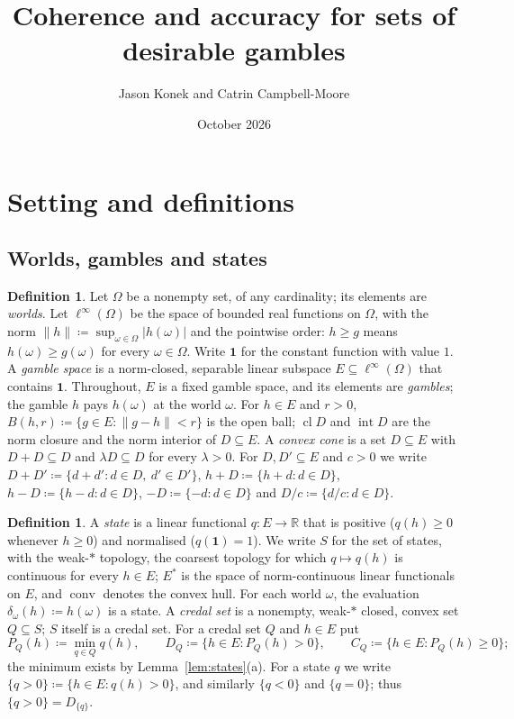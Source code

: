 \documentclass[11pt]{article}
\title{Coherence and accuracy for sets of desirable gambles}
\author{Jason Konek and Catrin Campbell-Moore}
\date{October 2026}
\newcommand{\R}{\mathbb{R}}
\newcommand{\one}{\mathbf{1}}
\DeclareMathOperator{\conv}{conv}
\DeclareMathOperator{\cl}{cl}
\DeclareMathOperator{\inter}{int}
\theoremstyle{plain}
\theoremstyle{definition}
\newtheorem{definition}[theorem]{Definition}
\theoremstyle{remark}
\begin{document}
\maketitle

\section{Setting and definitions}\label{sec:setting}

\subsection{Worlds, gambles and states}

\begin{definition}\label{def:gambles}
Let $\Omega$ be a nonempty set, of any cardinality; its elements are \emph{worlds}. Let
$\ell^\infty(\Omega)$ be the space of bounded real functions on $\Omega$, with the norm
$\|h\|\coloneqq\sup_{\omega\in\Omega}|h(\omega)|$ and the pointwise order: $h\ge g$ means
$h(\omega)\ge g(\omega)$ for every $\omega\in\Omega$. Write $\one$ for the constant function
with value $1$. A \emph{gamble space} is a norm-closed, separable linear subspace
$E\subseteq\ell^\infty(\Omega)$ that contains $\one$. Throughout, $E$ is a fixed gamble space,
and its elements are \emph{gambles}; the gamble $h$ pays $h(\omega)$ at the world $\omega$. For
$h\in E$ and $r>0$, $B(h,r)\coloneqq\{g\in E:\|g-h\|<r\}$ is the open ball; $\cl D$ and
$\inter D$ are the norm closure and the norm interior of $D\subseteq E$. A \emph{convex
cone} is a set $D\subseteq E$ with $D+D\subseteq D$ and $\lambda D\subseteq D$ for every
$\lambda>0$. For $D,D'\subseteq E$ and $c>0$ we write $D+D'\coloneqq\{d+d':d\in D,\ d'\in D'\}$,
$h+D\coloneqq\{h+d:d\in D\}$, $h-D\coloneqq\{h-d:d\in D\}$, $-D\coloneqq\{-d:d\in D\}$ and
$D/c\coloneqq\{d/c:d\in D\}$.
\end{definition}

\begin{definition}\label{def:states}
A \emph{state} is a linear functional $q:E\to\R$ that is positive ($q(h)\ge0$ whenever
$h\ge0$) and normalised ($q(\one)=1$). We write $S$ for the set of states, with the
weak-$\ast$ topology, the coarsest topology for which $q\mapsto q(h)$ is continuous for every
$h\in E$; $E^\ast$ is the space of norm-continuous linear functionals on $E$, and $\conv$
denotes the convex hull. For each world $\omega$, the evaluation $\delta_\omega(h)\coloneqq h(\omega)$ is a
state. A \emph{credal set} is a nonempty, weak-$\ast$ closed, convex set $Q\subseteq S$; $S$
itself is a credal set. For a credal set $Q$ and $h\in E$ put
\[
  P_Q(h)\coloneqq\min_{q\in Q}q(h),\qquad D_Q\coloneqq\{h\in E:P_Q(h)>0\},\qquad
  C_Q\coloneqq\{h\in E:P_Q(h)\ge0\};
\]
the minimum exists by Lemma~\ref{lem:states}(a). For a state $q$ we write $\{q>0\}\coloneqq
\{h\in E:q(h)>0\}$, and similarly $\{q<0\}$ and $\{q=0\}$; thus $\{q>0\}=D_{\{q\}}$.
\end{definition}
\end{document}
